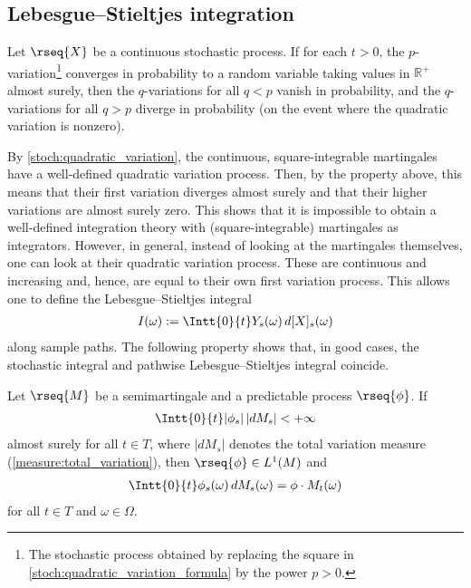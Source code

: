 \subsection{Lebesgue--Stieltjes integration}\label{section:stochastic_lebesgue_stieltjes}

    \begin{property}
        Let $\rseq{X}$ be a continuous stochastic process. If for each $t>0$, the $p$-variation\footnote{The stochastic process obtained by replacing the square in \cref{stoch:quadratic_variation_formula} by the power $p>0$.} converges in probability to a random variable taking values in $\mathbb{R}^+$ almost surely, then the $q$-variations for all $q<p$ vanish in probability, and the $q$-variations for all $q>p$ diverge in probability (on the event where the quadratic variation is nonzero).
    \end{property}
    By \cref{stoch:quadratic_variation}, the continuous, square-integrable martingales have a well-defined quadratic variation process. Then, by the property above, this means that their first variation diverges almost surely and that their higher variations are almost surely zero. This shows that it is impossible to obtain a well-defined integration theory with (square-integrable) martingales as integrators. However, in general, instead of looking at the martingales themselves, one can look at their quadratic variation process. These are continuous and increasing and, hence, are equal to their own first variation process. This allows one to define the Lebesgue--Stieltjes integral
    \begin{gather}
        I(\omega) := \Intt{0}{t}Y_s(\omega)\,d[X]_s(\omega)
    \end{gather}
    along sample paths. The following property shows that, in good cases, the stochastic integral and pathwise Lebesgue--Stieltjes integral coincide.
    \begin{property}
        Let $\rseq{M}$ be a semimartingale and a predictable process $\rseq{\phi}$. If
        \begin{gather}
            \Intt{0}{t}|\phi_s|\,|dM_s| < +\infty
        \end{gather}
        almost surely for all $t\in T$, where $|dM_s|$ denotes the total variation measure (\cref{measure:total_variation}), then $\rseq{\phi}\in L^1(M)$ and
        \begin{gather}
            \Intt{0}{t}\phi_s(\omega)\,dM_s(\omega) = \phi\cdot M_t(\omega)
        \end{gather}
        for all $t\in T$ and $\omega\in\Omega$.
    \end{property}

